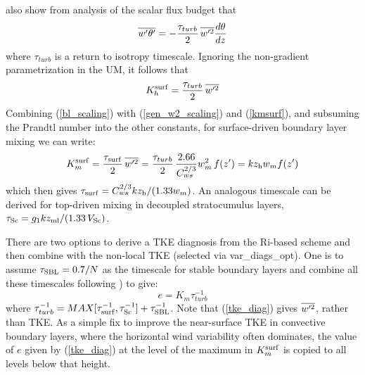 \documentclass{UMDP_article}
\begin{document}
\cite{holtslag91:_eddy_diffus_count_trans_convec} also show from
analysis of the scalar flux budget that
\begin{equation*}
  \overline{w'\theta'} = - \frac{\tau_{turb}}{2} \, \overline{w'^2} \frac{d \theta}{dz}
\end{equation*}
where $\tau_{turb}$ is a return to isotropy timescale.  Ignoring the
non-gradient parametrization in the UM, it follows that
\begin{equation}
  K_h^{\rm surf} =  \frac{\tau_{turb}}{2} \, \overline{w'^2}
  \label{bl_scaling}
\end{equation}
Combining (\ref{bl_scaling}) with (\ref{gen_w2_scaling}) and
(\ref{kmsurf}), and subsuming the Prandtl number into the other
constants, for surface-driven boundary layer mixing we can write:
\begin{equation*}
  K_m^{\rm surf} = \frac{\tau_{\rm surf}}{2} \, \overline{w'^2} = \frac{\tau_{turb}}{2} \, \frac{2.66 }{C_{ws}^{2/3}} w_m^2 \, f(z') = k z_{\rm h} w_m f(z')
\end{equation*}
which then gives $\tau_{\rm surf} = C_{ws}^{2/3} k z_{\rm h} / (1.33 w_m)
$.  An analogous timescale can be derived for top-driven mixing in
decoupled stratocumulus layers, $\tau_{\rm Sc} = g_1 k z_{\rm ml} / (1.33 \,
V_{\rm Sc}) $.  

There are two options to derive a TKE diagnosis from the Ri-based scheme 
and then combine with the non-local TKE (selected via var\_diags\_opt).  One 
is to assume $\tau_{\rm SBL}=0.7/N$ as the timescale for
stable boundary layers and combine all these timescales following
\cite{Suselj2012}) to give:
\begin{equation}
  e = K_m \tau_{turb}^{-1}
  \label{tke_diag}
\end{equation}
where $\tau_{turb}^{-1} = MAX[ \tau_{\rm surf}^{-1},\tau_{\rm  Sc}^{-1}] + \tau_{\rm SBL}^{-1}$.  
Note that (\ref{tke_diag}) gives $\overline{w'^2}$, rather than TKE.  As a simple fix
to improve the near-surface TKE in convective boundary layers, where the horizontal 
wind variability often dominates, the value of $e$ given by (\ref{tke_diag}) at 
the level of the maximum in $K_m^{\rm surf}$ is copied to all levels below that height.
\end{document}
